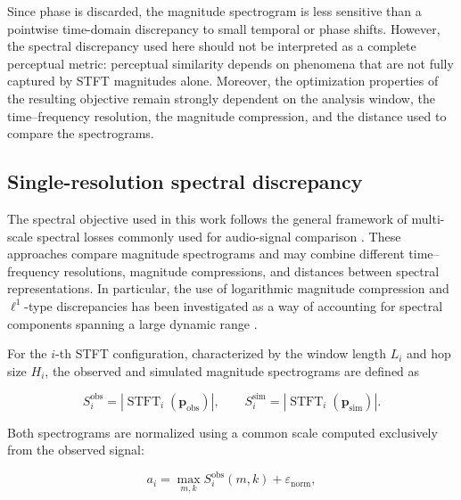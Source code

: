 \documentclass[11pt,a4paper]{report}
\theoremstyle{plain}
\theoremstyle{definition}
\begin{document}
Since phase is discarded, the magnitude spectrogram is less sensitive than a
pointwise time-domain discrepancy to small temporal or phase shifts. However,
the spectral discrepancy used here should not be interpreted as a complete
perceptual metric: perceptual similarity depends on phenomena that are not
fully captured by STFT magnitudes alone. Moreover, the optimization properties
of the resulting objective remain strongly dependent on the analysis window,
the time--frequency resolution, the magnitude compression, and the distance
used to compare the spectrograms.


\subsection{Single-resolution spectral discrepancy}
\label{subsec:single_resolution_spectral_loss}

The spectral objective used in this work follows the general framework of
multi-scale spectral losses commonly used for audio-signal comparison
\cite{schwaer2023multi}. These approaches compare magnitude spectrograms
and may combine different time--frequency resolutions, magnitude
compressions, and distances between spectral representations. In particular,
the use of logarithmic magnitude compression and $\ell^1$-type discrepancies
has been investigated as a way of accounting for spectral components spanning
a large dynamic range \cite{schwaer2023multi}.

For the \(i\)-th STFT configuration, characterized by the window length \(L_i\)
and hop size \(H_i\), the observed and simulated magnitude spectrograms are
defined as

\begin{equation}
S_i^{\mathrm{obs}}
=
\left|
\operatorname{STFT}_i
\left(
\mathbf{p}_{\mathrm{obs}}
\right)
\right|,
\qquad
S_i^{\mathrm{sim}}
=
\left|
\operatorname{STFT}_i
\left(
\mathbf{p}_{\mathrm{sim}}
\right)
\right|.
\label{eq:target_predicted_spectrograms}
\end{equation}

Both spectrograms are normalized using a common scale computed exclusively
from the observed signal:

\begin{equation}
a_i
=
\max_{m,k}
S_i^{\mathrm{obs}}(m,k)
+
\varepsilon_{\mathrm{norm}},
\label{eq:spectral_normalization_scale}
\end{equation}
\end{document}
